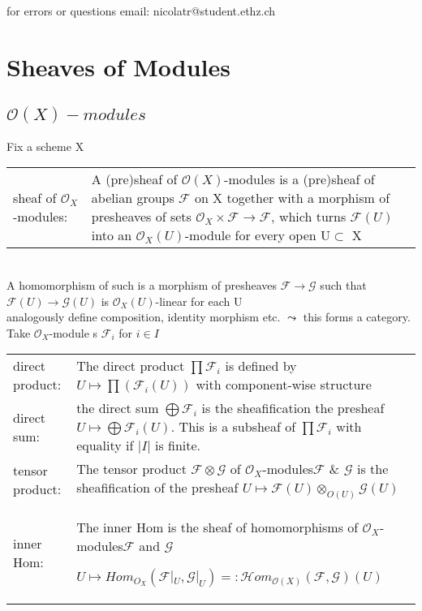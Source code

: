 \documentclass[a4paper, 12pt]{article}
\newcommand{\ca}[1]{\mathcal{#1}}
\newcommand{\caf}{\mathcal{F}}
\newcommand{\cag}{\mathcal{G}}
\newcommand{\oxmod}{$\mathcal{O}_X$-module }
\newcommand{\oxmods}{$\mathcal{O}_X$-modules}
\begin{document}
\setcounter{section}{4}

for errors or questions email: nicolatr@student.ethz.ch

\section{Sheaves of Modules}
\subsection{$\mathcal{O}(X)-modules$}
Fix a scheme X
\\

\begin{tabular}{p{4cm} p{11cm}}


sheaf of \oxmods: & A (pre)sheaf of  $\mathcal{O}(X)$-modules is a (pre)sheaf of abelian groups $\mathcal{F}$ on X together with a morphism of presheaves of sets $\mathcal{O}_X\times\mathcal{F}\longrightarrow\mathcal{F}$, which turns $\mathcal{F}(U)$ into an $\mathcal{O}_X(U)$-module for every open U$\subset$ X
\\

\end{tabular}
\\

A homomorphism of such is a morphism of presheaves $\mathcal{F}\rightarrow\mathcal{G}$ such that $\mathcal{F}(U)\rightarrow\mathcal{G}(U)$ is $\ca{O}_X(U)$-linear for each U
\\

analogously define composition, identity morphism etc. $\leadsto$ this forms a category.
\\

Take \oxmod s  $\ca{F}_i$ for $i \in I$
\\

\begin{tabular}{p{4cm} p{12cm}}


direct product: & The direct product $\prod \ca{F}_i$ is defined by $U\longmapsto \prod(\ca{F}_i(U))$ with component-wise structure
\\

direct sum: & the direct sum $\bigoplus \ca{F}_i$ is the sheafification the presheaf $U\longmapsto \bigoplus \ca{F}_i(U)$. This is a subsheaf of $\prod\ca{F}_i$ with equality if $|I|$ is finite.
\\

tensor product: &The tensor product $\ca{F}\otimes\ca{G}$ of \oxmods $\ca{F}$ \& $\cag$ is the sheafification of the presheaf $U\longmapsto \caf(U)\otimes_{O(U)}\cag(U)$
\\

inner Hom: & The inner Hom is the sheaf of homomorphisms of \oxmods $\caf$ and $\cag$

$U\longmapsto Hom_{O_X}(\caf|_U , \cag|_U) =: \ca{H}om_{\ca{O}(X)}(\caf , \cag)(U)$


\end{tabular}
\end{document}

